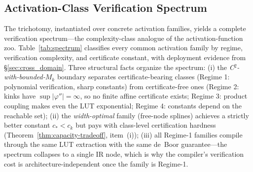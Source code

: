 \vspace{4pt}
\subsection{Activation-Class Verification Spectrum}
\label{sec:spectrum}

The trichotomy, instantiated over concrete activation families, yields
a complete verification spectrum---the complexity-class analogue of the
activation-function zoo. Table~\ref{tab:spectrum} classifies every
common activation family by regime, verification complexity, and
certificate constant, with deployment evidence from
{\S}\ref{sec:cross_domain}. Three structural facts organize the
spectrum: (i) the \emph{C$^2$-with-bounded-$M_k$} boundary separates
certificate-bearing classes (Regime 1: polynomial verification, sharp
constants) from certificate-free ones (Regime 2: kinks have
$\sup|\varphi''| = \infty$, so no finite affine certificate exists;
Regime 3: product coupling makes even the LUT exponential; Regime 4:
constants depend on the reachable set); (ii) the \emph{width-optimal}
family (free-node splines) achieves a strictly better constant
$c_* < c_k$ but pays with class-level certification hardness
(Theorem~\ref{thm:capacity-tradeoff}, item~(i)); (iii) all Regime-1
families compile through the same LUT extraction with the same de~Boor
guarantee---the spectrum collapses to a single IR node, which is why
the compiler's verification cost is architecture-independent once the
family is Regime-1.

